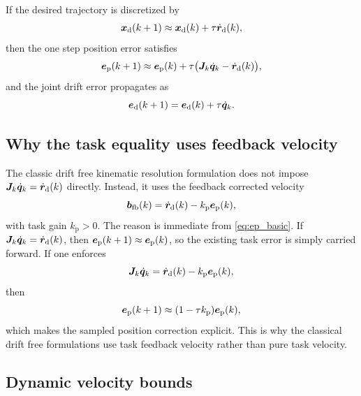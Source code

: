 If the desired trajectory is discretized by
\begin{equation}
  \bm{x}_{\mathrm{d}}(k+1) \approx \bm{x}_{\mathrm{d}}(k) + \tau \dot{\bm{r}}_{\mathrm{d}}(k),
\end{equation}
then the one step position error satisfies
\begin{equation}
  \bm{e}_{\mathrm{p}}(k+1) \approx \bm{e}_{\mathrm{p}}(k) + \tau \bigl(\bm{J}_k \dot{\bm{q}}_k - \dot{\bm{r}}_{\mathrm{d}}(k)\bigr),
  \label{eq:ep_basic}
\end{equation}
and the joint drift error propagates as
\begin{equation}
  \bm{e}_{\mathrm{d}}(k+1) = \bm{e}_{\mathrm{d}}(k) + \tau \dot{\bm{q}}_k.
  \label{eq:ed_basic}
\end{equation}

\subsection{Why the task equality uses feedback velocity}

The classic drift free kinematic resolution formulation does not impose $\bm{J}_k \dot{\bm{q}}_k = \dot{\bm{r}}_{\mathrm{d}}(k)$ directly. Instead, it uses the feedback corrected velocity
\begin{equation}
  \bm{b}_{\mathrm{fb}}(k) = \dot{\bm{r}}_{\mathrm{d}}(k) - k_{\mathrm{p}} \bm{e}_{\mathrm{p}}(k),
  \label{eq:bfb}
\end{equation}
with task gain $k_{\mathrm{p}} > 0$. The reason is immediate from \eqref{eq:ep_basic}. If $\bm{J}_k \dot{\bm{q}}_k = \dot{\bm{r}}_{\mathrm{d}}(k)$, then $\bm{e}_{\mathrm{p}}(k+1) \approx \bm{e}_{\mathrm{p}}(k)$, so the existing task error is simply carried forward. If one enforces
\begin{equation}
  \bm{J}_k \dot{\bm{q}}_k = \dot{\bm{r}}_{\mathrm{d}}(k) - k_{\mathrm{p}} \bm{e}_{\mathrm{p}}(k),
  \label{eq:task_feedback_constraint}
\end{equation}
then
\begin{equation}
  \bm{e}_{\mathrm{p}}(k+1) \approx (1 - \tau k_{\mathrm{p}})\bm{e}_{\mathrm{p}}(k),
\end{equation}
which makes the sampled position correction explicit. This is why the classical drift free formulations use task feedback velocity rather than pure task velocity.

\subsection{Dynamic velocity bounds}

